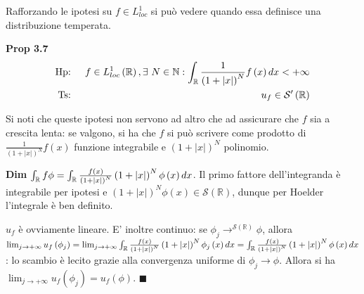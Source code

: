 \documentclass{article}
\begin{document}
Rafforzando le ipotesi su $f\in L_{loc}^{1}$ si pu\`{o} vedere quando essa
definisce una distribuzione temperata.

\textbf{Prop 3.7 }%
\begin{eqnarray*}
\text{Hp}\text{: } &&f\in L_{loc}^{1}\left( 
\mathbb{R}
\right) ,\exists \text{ }N\in 
\mathbb{N}
:\int_{%
\mathbb{R}
}\frac{1}{\left( 1+\left\vert x\right\vert \right) ^{N}}f\left( x\right)
dx<+\infty \\
\text{Ts}\text{: } &&u_{f}\in \mathcal{S}^{\prime }\left( 
\mathbb{R}
\right)
\end{eqnarray*}

Si noti che queste ipotesi non servono ad altro che ad assicurare che $f$
sia a crescita lenta: se valgono, si ha che $f$ si pu\`{o} scrivere come
prodotto di $\frac{1}{\left( 1+\left\vert x\right\vert \right) ^{N}}f\left(
x\right) $ funzione integrabile e $\left( 1+\left\vert x\right\vert \right)
^{N}$ polinomio.

\textbf{Dim} $\int_{%
\mathbb{R}
}f\phi =\int_{%
\mathbb{R}
}\frac{f\left( x\right) }{\left( 1+\left\vert x\right\vert \right) ^{N}}%
\left( 1+\left\vert x\right\vert \right) ^{N}\phi \left( x\right) dx$. Il
primo fattore dell'integranda \`{e} integrabile per ipotesi e $\left(
1+\left\vert x\right\vert \right) ^{N}\phi \left( x\right) \in \mathcal{S}%
\left( 
\mathbb{R}
\right) $, dunque per Hoelder l'integrale \`{e} ben definito.

$u_{f}$ \`{e} ovviamente lineare. E' inoltre continuo: se $\phi
_{j}\rightarrow ^{\mathcal{S}\left( 
\mathbb{R}
\right) }\phi $, allora $\lim_{j\rightarrow +\infty }u_{f}\left( \phi
_{j}\right) =\lim_{j\rightarrow +\infty }\int_{%
\mathbb{R}
}\frac{f\left( x\right) }{\left( 1+\left\vert x\right\vert \right) ^{N}}%
\left( 1+\left\vert x\right\vert \right) ^{N}\phi _{j}\left( x\right)
dx=\int_{%
\mathbb{R}
}\frac{f\left( x\right) }{\left( 1+\left\vert x\right\vert \right) ^{N}}%
\left( 1+\left\vert x\right\vert \right) ^{N}\phi \left( x\right) dx$: lo
scambio \`{e} lecito grazie alla convergenza uniforme di $\phi
_{j}\rightarrow \phi $. Allora si ha $\lim_{j\rightarrow +\infty
}u_{f}\left( \phi _{j}\right) =u_{f}\left( \phi \right) $. $\blacksquare $
\end{document}
